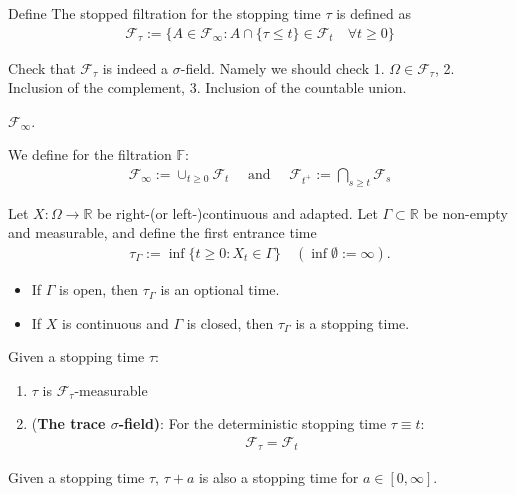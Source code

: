 \begin{definition}
Define
The stopped filtration for the stopping time $\tau$ is defined as 
\begin{align*}
	\mathcal{F}_\tau:= \{ A \in \mathcal{F}_\infty: A \cap \{ \tau \le t \} \in \mathcal{F}_t \quad \forall t \ge 0\}
\end{align*}
\end{definition}
\begin{remark}
Check that $\mathcal{F}_\tau$ is indeed a $\sigma$-field. Namely we should check 1. $\Omega \in \mathcal{F}_\tau$, 2. Inclusion of the complement, 3. Inclusion of the countable union. 	
\end{remark}
\begin{remark}
$\mathcal{F}_\infty$. 	
\end{remark}


\begin{definition}
	We define for the filtration $\mathbb{F}$: 
	\begin{align*}
	\mathcal{F}_\infty := \cup_{t \ge 0} \mathcal{F}_t
	\quad \text{ and } \quad \mathcal{F}_{t^+}:= \bigcap_{s \ge t} \mathcal{F}_s
\end{align*}

\end{definition}

\begin{lemma}
	Let $X: \Omega \to \mathbb{R}$ be right-(or left-)continuous and adapted. Let $\Gamma \subset \mathbb{R}$ be non-empty and measurable, and define the first entrance time
	\begin{align*}
		\tau_\Gamma := \inf\{ t \ge 0: X_t \in \Gamma \} \quad (\inf \emptyset := \infty).
	\end{align*}
	\begin{itemize}
		\item If $\Gamma$ is open, then $\tau_\Gamma$ is an optional time.
		\item If $X$ is continuous and $\Gamma$ is closed, then $\tau_\Gamma$ is a stopping time.
	\end{itemize}
\end{lemma}

\begin{lemma}
	Given a stopping time $\tau$:
	\begin{enumerate}
		\item $\tau$ is $\mathcal{F}_\tau$-measurable
		\item (\textbf{The trace $\sigma$-field)}: For the deterministic stopping time $\tau \equiv t$: 
		\begin{align*}
			\mathcal{F}_\tau = \mathcal{F}_t
		\end{align*}
	\end{enumerate}
\end{lemma}
\begin{remark}
Given a stopping time $\tau$, $\tau + a$ is also a stopping time for $a \in [0, \infty]$.
\end{remark}

